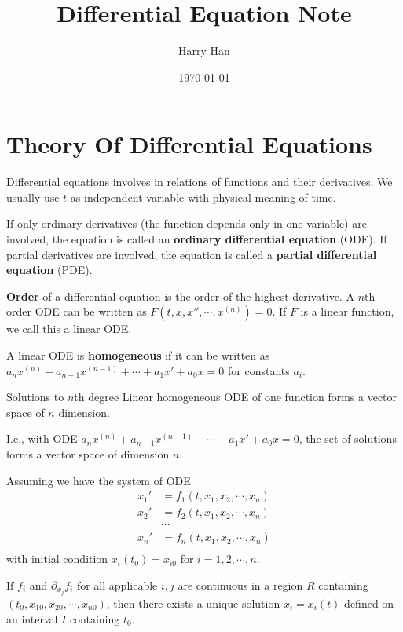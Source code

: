 \documentclass[12pt]{article}
\title{Differential Equation Note}
\author{Harry Han}
\date{\today}
\begin{document}
\section{Theory Of Differential Equations}

\begin{definition} 
	Differential equations involves in relations of functions and their derivatives.
	We usually use $t$ as independent variable with physical meaning of time.

	If only ordinary derivatives (the function depends only in one variable) are involved, the equation is called an \textbf{ordinary differential equation} (ODE).
	If partial derivatives are involved, the equation is called a \textbf{partial differential equation} (PDE).

	\textbf{Order} of a differential equation is the order of the highest derivative.
	A $n$th order ODE can be written as $F(t, x, x'', \cdots, x^{(n)}) = 0$. If $F$ is a linear function, we call this a linear ODE.

	A linear ODE is \textbf{homogeneous} if it can be written as $a_{n}x^{(n)} + a_{n-1}x^{(n-1)} + \cdots + a_{1}x' + a_{0}x = 0$ for constants $a_i$.
\end{definition}

\begin{definition}
\end{definition}

\begin{theorem}
	Solutions to $n$th degree Linear homogeneous ODE of one function forms a vector space of $n$ dimension.

	I.e., with ODE $a_{n}x^{(n)} + a_{n-1}x^{(n-1)} + \cdots + a_{1}x' + a_{0}x = 0$, the set of solutions forms a vector space of dimension $n$.
\end{theorem}

\begin{theorem}
	Assuming we have the system of ODE 
	\begin{equation}
	\begin{split}
	x_1' &= f_1(t, x_1, x_2, \cdots, x_n) \\
	x_2' &= f_2(t, x_1, x_2, \cdots, x_n) \\
	&\cdots \\
	x_n' &= f_n(t, x_1, x_2, \cdots, x_n) \\
	\end{split}
	\end{equation}
	with initial condition $x_i(t_0) = x_{i0}$ for $i = 1, 2, \cdots, n$. 

	If $f_i$ and $\partial_{x_j}f_i$ for all applicable $i, j$ are continuous in a region $R$ containing $(t_0, x_{10}, x_{20}, \cdots, x_{n0})$, then there exists a unique solution $x_i = x_i(t)$ defined on an interval $I$ containing $t_0$.
\end{theorem}
\end{document}
